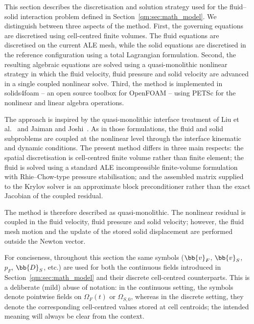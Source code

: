 This section describes the discretisation and solution strategy used for the fluid--solid interaction problem defined in Section~\ref{qm:sec:math_model}.
We distinguish between three aspects of the method. First, the governing equations are discretised using cell-centred finite volumes.
The fluid equations are discretised on the current ALE mesh, while the solid equations are discretised in the reference configuration using a total Lagrangian formulation.
Second, the resulting algebraic equations are solved using a quasi-monolithic nonlinear strategy in which the fluid velocity, fluid pressure and solid velocity are advanced in a single coupled nonlinear solve.
Third, the method is implemented in solids4foam \citep{Cardiff2025} -- an open source toolbox for OpenFOAM -- using PETSc \citep{PETSc} for the nonlinear and linear algebra operations.

The approach is inspired by the quasi-monolithic interface treatment of Liu et al.~\citep{Liu2014} and Jaiman and Joshi~\citep{JaimanJoshi2022}.
As in those formulations, the fluid and solid subproblems are coupled at the nonlinear level through the interface kinematic and dynamic conditions.
The present method differs in three main respects: the spatial discretisation is cell-centred finite volume rather than finite element; the fluid is solved using a standard ALE incompressible finite-volume formulation with Rhie--Chow-type pressure stabilisation; and the assembled matrix supplied to the Krylov solver is an approximate block preconditioner rather than the exact Jacobian of the coupled residual.

The method is therefore described as quasi-monolithic.
The nonlinear residual is coupled in the fluid velocity, fluid pressure and solid velocity; however, the fluid mesh motion and the update of the stored solid displacement are performed outside the Newton vector.

For conciseness, throughout this section the same symbols ($\bb{v}_F$, $\bb{v}_S$, $p_F$, $\bb{D}_S$, etc.) are used for both the continuous fields introduced in Section~\ref{qm:sec:math_model} and their discrete cell-centred counterparts. This is a deliberate (mild) abuse of notation: in the continuous setting, the symbols denote pointwise fields on $\Omega_F(t)$ or $\Omega_{S,0}$, whereas in the discrete setting, they denote the corresponding cell-centred values stored at cell centroids; the intended meaning will always be clear from the context.


